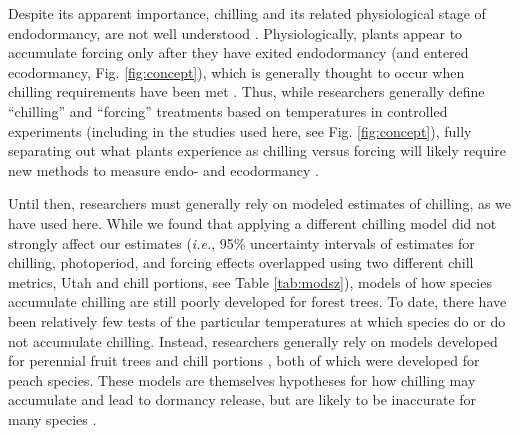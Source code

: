 \documentclass{article}
\newcommand{\R}[1]{\label{#1}\linelabel{#1}}
\begin{document}
\par Despite its apparent importance, chilling and its related physiological stage of endodormancy, are not well understood \emph{\citep{chuine2016}}. Physiologically, plants appear to accumulate forcing only after they have exited endodormancy (and entered ecodormancy, Fig. \ref{fig:concept}), which is generally thought to occur when chilling requirements have been met \emph{\citep{chuine2016}}. Thus, while researchers generally define ``chilling'' and ``forcing'' treatments based on temperatures in controlled experiments\R{ee7} (including in the studies used here, see Fig. \ref{fig:concept}), fully separating out what plants experience as chilling versus forcing will likely require new methods to measure endo- and ecodormancy \emph{\citep{vanderschoot2014}}. 

\par Until then, researchers must generally rely on modeled estimates of chilling, as we have used here. While we found that applying a different chilling model did not strongly affect our estimates (\emph{i.e.}, 95\% uncertainty intervals of estimates for chilling, photoperiod, and forcing effects overlapped using two different chill metrics, Utah and chill portions, see Table \ref{tab:modsz}), models of how species accumulate chilling are still poorly developed for forest trees. To date, there have been relatively few tests of the particular temperatures at which species do or do not accumulate chilling. Instead, researchers generally rely on models developed for perennial fruit trees \emph{\citep[i.e., ][]{richardson1974}} and chill portions \emph{\citep{fishman1987}}, both of which were developed for peach species. These models are themselves hypotheses for how chilling may accumulate and lead to dormancy release, but are likely to be inaccurate for many species \emph{\citep{dennis2003}}. 
\end{document}
